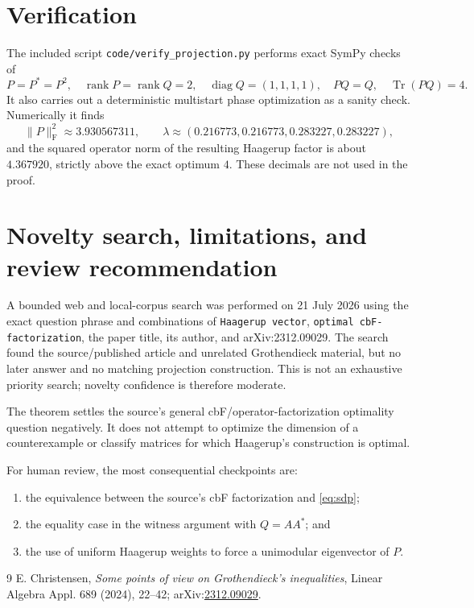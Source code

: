 \documentclass[11pt]{article}
\newcommand{\Tr}{\operatorname{Tr}}
\newcommand{\diag}{\operatorname{diag}}
\newcommand{\F}{\mathrm{F}}
\begin{document}
\section{Verification}

The included script \texttt{code/verify\_projection.py} performs exact SymPy
checks of
\[
 P=P^*=P^2,\quad \operatorname{rank}P=\operatorname{rank}Q=2,\quad
 \diag Q=(1,1,1,1),\quad PQ=Q,\quad \Tr(PQ)=4.
\]
It also carries out a deterministic multistart phase optimization as a sanity
check.  Numerically it finds
\[
 \|P\|_{\F}^2\approx3.930567311,
 \qquad
 \lambda\approx(0.216773,0.216773,0.283227,0.283227),
\]
and the squared operator norm of the resulting Haagerup factor is about
$4.367920$, strictly above the exact optimum $4$.  These decimals are not used
in the proof.

\section{Novelty search, limitations, and review recommendation}

A bounded web and local-corpus search was performed on 21 July 2026 using the
exact question phrase and combinations of \texttt{Haagerup vector},
\texttt{optimal cbF-factorization}, the paper title, its author, and
arXiv:2312.09029.  The search found the source/published article and unrelated
Grothendieck material, but no later answer and no matching projection
construction.  This is not an exhaustive priority search; novelty confidence
is therefore moderate.

The theorem settles the source's general cbF/operator-factorization optimality
question negatively.  It does not attempt to optimize the dimension of a
counterexample or classify matrices for which Haagerup's construction is
optimal.

For human review, the most consequential checkpoints are:
\begin{enumerate}[leftmargin=*]
 \item the equivalence between the source's cbF factorization and
       \eqref{eq:sdp};
 \item the equality case in the witness argument with $Q=AA^*$; and
 \item the use of uniform Haagerup weights to force a unimodular eigenvector
       of $P$.
\end{enumerate}

\begin{thebibliography}{9}
E. Christensen,
\emph{Some points of view on Grothendieck's inequalities},
Linear Algebra Appl. 689 (2024), 22--42;
arXiv:\href{https://arxiv.org/abs/2312.09029}{2312.09029}.
\end{thebibliography}
\end{document}
